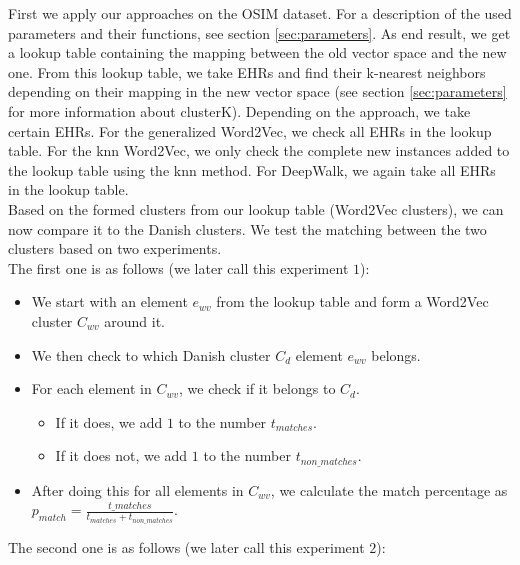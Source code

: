First we apply our approaches on the OSIM dataset. For a description of the used parameters and their functions, see section \ref{sec:parameters}. As end result, we get a lookup table containing the mapping between the old vector space and the new one. From this lookup table, we take EHRs and find their k-nearest neighbors depending on their mapping in the new vector space (see section \ref{sec:parameters} for more information about clusterK). Depending on the approach, we take certain EHRs. For the generalized Word2Vec, we check all EHRs in the lookup table. For the knn Word2Vec, we only check the complete new instances added to the lookup table using the knn method. For DeepWalk, we again take all EHRs in the lookup table. \\

Based on the formed clusters from our lookup table (Word2Vec clusters), we can now compare it to the Danish clusters. We test the matching between the two clusters based on two experiments. \\
The first one is as follows (we later call this experiment $1$):

\begin{itemize}

\item We start with an element $e_{wv}$ from the lookup table and form a Word2Vec cluster $C_{wv}$ around it.
\item We then check to which Danish cluster $C_d$ element $e_{wv}$ belongs.
\item For each element in $C_{wv}$, we check if it belongs to $C_d$.
\begin{itemize}
\item If it does, we add $1$ to the number $t_{matches}$.
\item If it does not, we add $1$ to the number $t_{non\_matches}$.
\end{itemize}
\item After doing this for all elements in $C_{wv}$, we calculate the match percentage as $p_{match} = \frac{t\_{matches}}{t_{matches} + t_{non\_matches}}$.

\end{itemize}

\noindent The second one is as follows (we later call this experiment $2$):

